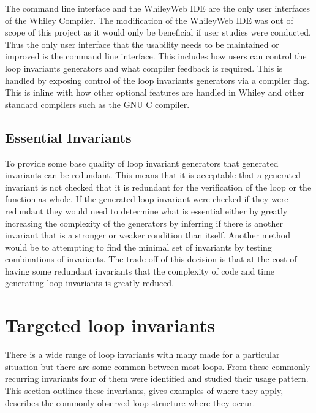 The command line interface and the WhileyWeb IDE are the only user interfaces
of the Whiley Compiler.
The modification of the WhileyWeb IDE was out of scope of this project as it
would only be beneficial if user studies were conducted.
Thus the only user interface that the usability needs to be maintained or
improved is the command line interface.
This includes how users can control the loop invariants generators and what
compiler feedback is required.
This is handled by exposing control of the loop invariants generators via
a compiler flag.
This is inline with how other optional features are handled in Whiley and
other standard compilers such as the GNU C compiler.

\subsection{Essential Invariants}\label{s:essential-inv}

To provide some base quality of loop invariant generators that generated invariants 
can be redundant.
This means that it is acceptable that a generated invariant is not
checked that it is redundant for the verification of the loop or the function
as whole.
If the generated loop invariant were checked if they were redundant
they would need to determine what is essential either by greatly increasing
the complexity of the generators by inferring if there is another invariant
that is a stronger or weaker condition than itself.
Another method would be to attempting to find the
minimal set of invariants by testing combinations of invariants.
The trade-off of this decision is that at the cost of having some redundant
invariants that the complexity of code and time generating loop invariants is
greatly reduced.

\section{Targeted loop invariants}\label{s:target-loop-inv}

There is a wide range of loop invariants with many made for a particular situation
but there are some common between most loops.
From these commonly recurring invariants four of them were identified and
studied their usage pattern.
This section outlines these invariants, gives examples of where they apply,
describes the commonly observed loop structure where they occur.

